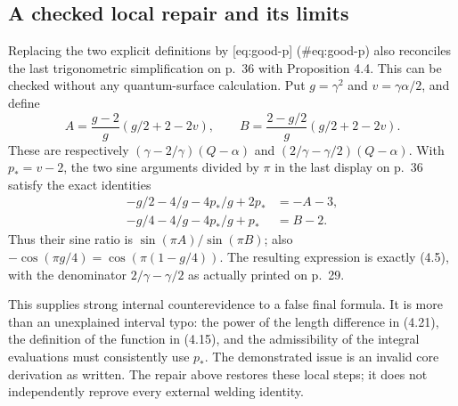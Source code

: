\documentclass[10pt]{article}
\begin{document}
\subsection*{A checked local repair and its limits}
Replacing the two explicit definitions by [eq:good-p] (\#eq:good-p) also reconciles the last trigonometric simplification on p. 36 with Proposition 4.4. This can be checked without any quantum-surface calculation. Put \(g=\gamma^2\) and \(v=\gamma\alpha/2\), and define \[A=\frac{g-2}{g}(g/2+2-2v),\qquad
 B=\frac{2-g/2}{g}(g/2+2-2v).\] These are respectively \((\gamma-2/\gamma)(Q-\alpha)\) and \((2/\gamma-\gamma/2)(Q-\alpha)\). With \(p_*=v-2\), the two sine arguments divided by \(\pi\) in the last display on p. 36 satisfy the exact identities \[\begin{split}
 -g/2-4/g-4p_*/g+2p_*&=-A-3,\\
 -g/4-4/g-4p_*/g+p_*&=B-2.
 \end{split}\] Thus their sine ratio is \(\sin(\pi A)/\sin(\pi B)\); also \(-\cos(\pi g/4)=\cos(\pi(1-g/4))\). The resulting expression is exactly (4.5), with the denominator \(2/\gamma-\gamma/2\) as actually printed on p. 29.\par
This supplies strong internal counterevidence to a false final formula. It is more than an unexplained interval typo: the power of the length difference in (4.21), the definition of the function in (4.15), and the admissibility of the integral evaluations must consistently use \(p_*\). The demonstrated issue is an invalid core derivation as written. The repair above restores these local steps; it does not independently reprove every external welding identity.\par
\end{document}

